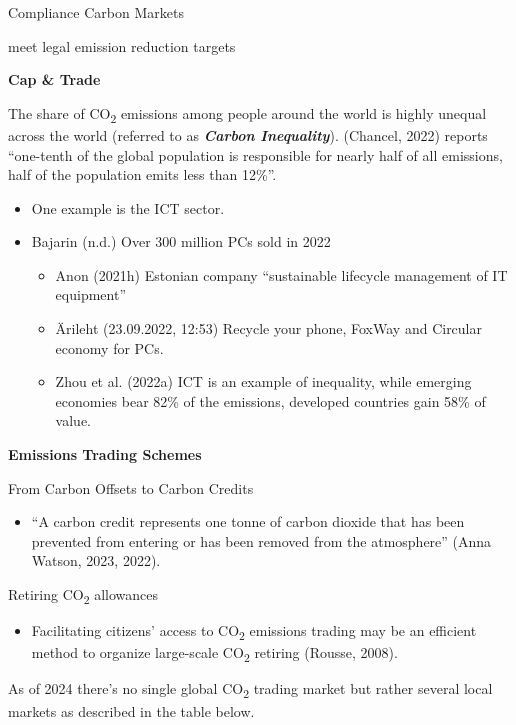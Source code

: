 \documentclass[
  letterpaper,
  DIV=11,
  numbers=noendperiod]{scrartcl}
\providecommand{\tightlist}{%
  \setlength{\itemsep}{0pt}\setlength{\parskip}{0pt}}\usepackage{longtable,booktabs,array}
\begin{document}
Compliance Carbon Markets

meet legal emission reduction targets

\textbf{Cap \& Trade}

The share of CO\textsubscript{2} emissions among people around the world
is highly unequal across the world (referred to as \textbf{\emph{Carbon
Inequality}}). (Chancel, 2022) reports ``one-tenth of the global
population is responsible for nearly half of all emissions, half of the
population emits less than 12\%''.

\begin{itemize}
\item
  One example is the ICT sector.
\item
  Bajarin (n.d.) Over 300 million PCs sold in 2022

  \begin{itemize}
  \tightlist
  \item
    Anon (2021h) Estonian company ``sustainable lifecycle management of
    IT equipment''
  \item
    Ärileht (23.09.2022, 12:53) Recycle your phone, FoxWay and Circular
    economy for PCs.
  \item
    Zhou et al. (2022a) ICT is an example of inequality, while emerging
    economies bear 82\% of the emissions, developed countries gain 58\%
    of value.
  \end{itemize}
\end{itemize}

\textbf{Emissions Trading Schemes}

From Carbon Offsets to Carbon Credits

\begin{itemize}
\tightlist
\item
  ``A carbon credit represents one tonne of carbon dioxide that has been
  prevented from entering or has been removed from the atmosphere''
  (Anna Watson, 2023, 2022).
\end{itemize}

Retiring CO\textsubscript{2} allowances

\begin{itemize}
\tightlist
\item
  Facilitating citizens' access to CO\textsubscript{2} emissions trading
  may be an efficient method to organize large-scale CO\textsubscript{2}
  retiring (Rousse, 2008).
\end{itemize}

As of 2024 there's no single global CO\textsubscript{2} trading market
but rather several local markets as described in the table below.
\end{document}
